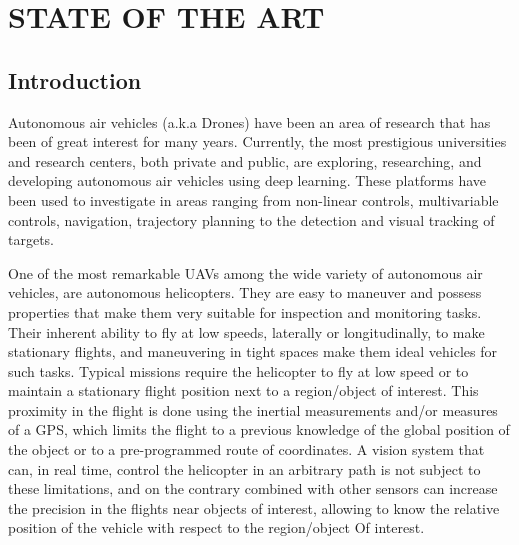 %
%
%

\chapter{\uppercase{State of the art}}

\section{Introduction}
Autonomous air vehicles (a.k.a Drones) have been an area of research that has been of great interest for many years. Currently, the most prestigious universities and research centers, both private and public, are exploring, researching, and developing autonomous air vehicles using deep learning. These platforms have been used to investigate in areas ranging from non-linear controls, multivariable controls, navigation, trajectory planning to the detection and visual tracking of targets.

One of the most remarkable UAVs among the wide variety of autonomous air vehicles, are autonomous helicopters. They are easy to maneuver and possess properties that make them very suitable for inspection and monitoring tasks. Their inherent ability to fly at low speeds, laterally or longitudinally, to make stationary flights, and maneuvering in tight spaces make them ideal vehicles for such tasks. Typical missions require the helicopter to fly at low speed or to maintain a  stationary flight position next to a region/object of interest. This proximity in the flight is done using the inertial measurements and/or measures of a GPS, which limits the flight to a previous knowledge of the global position of the object or to a pre-programmed route of coordinates. A vision system that can, in real time, control the helicopter in an arbitrary path is not subject to these limitations, and on the contrary combined with other sensors can increase the precision in the flights near objects of interest, allowing to know the relative position of the vehicle with respect to the region/object Of interest.


